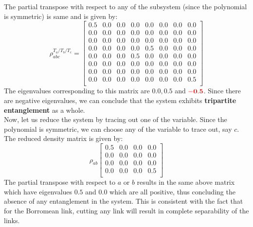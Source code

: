 \documentclass{scrartcl}
\begin{document}
    The partial transpose with respect to any of the subsystem (since the polynomial is symmetric) is same and is given by:
    \begin{equation*}
        \rho^{T_a/T_b/T_c}_{abc} =
        \left[
        \begin{array}{cccccccc}
        0.5 & 0.0 & 0.0 & 0.0 & 0.0 & 0.0 & 0.0 & 0.0 \\
        0.0 & 0.0 & 0.0 & 0.0 & 0.0 & 0.0 & 0.0 & 0.0 \\
        0.0 & 0.0 & 0.0 & 0.0 & 0.0 & 0.0 & 0.0 & 0.0 \\
        0.0 & 0.0 & 0.0 & 0.0 & 0.5 & 0.0 & 0.0 & 0.0 \\
        0.0 & 0.0 & 0.0 & 0.5 & 0.0 & 0.0 & 0.0 & 0.0 \\
        0.0 & 0.0 & 0.0 & 0.0 & 0.0 & 0.0 & 0.0 & 0.0 \\
        0.0 & 0.0 & 0.0 & 0.0 & 0.0 & 0.0 & 0.0 & 0.0 \\
        0.0 & 0.0 & 0.0 & 0.0 & 0.0 & 0.0 & 0.0 & 0.5 \\
        \end{array}
        \right]
        \end{equation*}
        The eigenvalues corresponding to this matrix are $0.0, 0.5$ and $\mathbf{\mathbf{\mathcolor{red}{-0.5}}}$. Since there are negative eigenvalues, we can conclude that the system exhibits \textbf{tripartite entanglement} as a whole.\\[0.3cm]
        Now, let us reduce the system by tracing out one of the variable. Since the polynomial is symmetric, we can choose any of the variable to trace out, say $c$. The reduced density matrix is given by:
        \begin{equation*}
            \rho_{ab}
            \left[
            \begin{array}{cccc}
            0.5 & 0.0 & 0.0 & 0.0 \\
            0.0 & 0.0 & 0.0 & 0.0 \\
            0.0 & 0.0 & 0.0 & 0.0 \\
            0.0 & 0.0 & 0.0 & 0.5 \\
            \end{array}
            \right]
            \end{equation*} 
            The partial transpose with respect to $a$ or $b$ results in the same above matrix which have eigenvalues $0.5$ and $0.0$ which are all positive, thus concluding the absence of any entanglement in the system. This is consistent with the fact that for the Borromean link, cutting any link will result in complete separability of the links.
\end{document}
